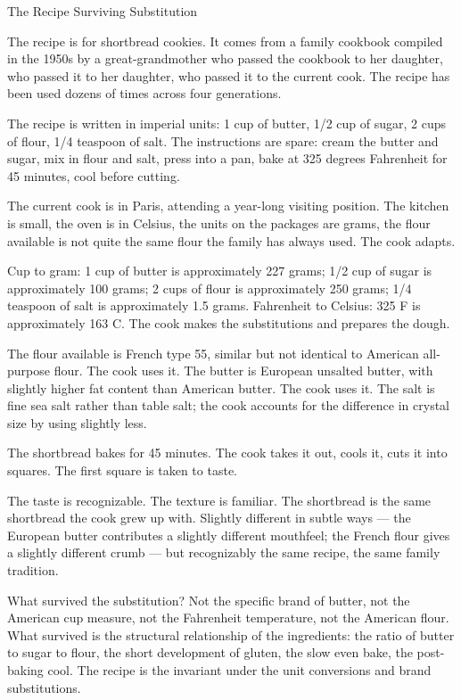 \begin{coda}{The Recipe Surviving Substitution}

The recipe is for shortbread cookies. It comes from a family
cookbook compiled in the 1950s by a great-grandmother who passed
the cookbook to her daughter, who passed it to her daughter, who
passed it to the current cook. The recipe has been used dozens of
times across four generations.

The recipe is written in imperial units: 1 cup of butter, 1/2 cup
of sugar, 2 cups of flour, 1/4 teaspoon of salt. The instructions
are spare: cream the butter and sugar, mix in flour and salt,
press into a pan, bake at 325 degrees Fahrenheit for 45 minutes,
cool before cutting.

The current cook is in Paris, attending a year-long visiting
position. The kitchen is small, the oven is in Celsius, the
units on the packages are grams, the flour available is not quite
the same flour the family has always used. The cook adapts.

Cup to gram: 1 cup of butter is approximately 227 grams; 1/2 cup of
sugar is approximately 100 grams; 2 cups of flour is approximately
250 grams; 1/4 teaspoon of salt is approximately 1.5 grams.
Fahrenheit to Celsius: 325 F is approximately 163 C. The cook
makes the substitutions and prepares the dough.

The flour available is French type 55, similar but not identical
to American all-purpose flour. The cook uses it. The butter is
European unsalted butter, with slightly higher fat content than
American butter. The cook uses it. The salt is fine sea salt
rather than table salt; the cook accounts for the difference in
crystal size by using slightly less.

The shortbread bakes for 45 minutes. The cook takes it out, cools
it, cuts it into squares. The first square is taken to taste.

The taste is recognizable. The texture is familiar. The shortbread
is the same shortbread the cook grew up with. Slightly different
in subtle ways --- the European butter contributes a slightly
different mouthfeel; the French flour gives a slightly different
crumb --- but recognizably the same recipe, the same family
tradition.

What survived the substitution? Not the specific brand of butter,
not the American cup measure, not the Fahrenheit temperature, not
the American flour. What survived is the structural relationship
of the ingredients: the ratio of butter to sugar to flour, the
short development of gluten, the slow even bake, the
post-baking cool. The recipe is the invariant under the
unit conversions and brand substitutions.


\end{coda}
